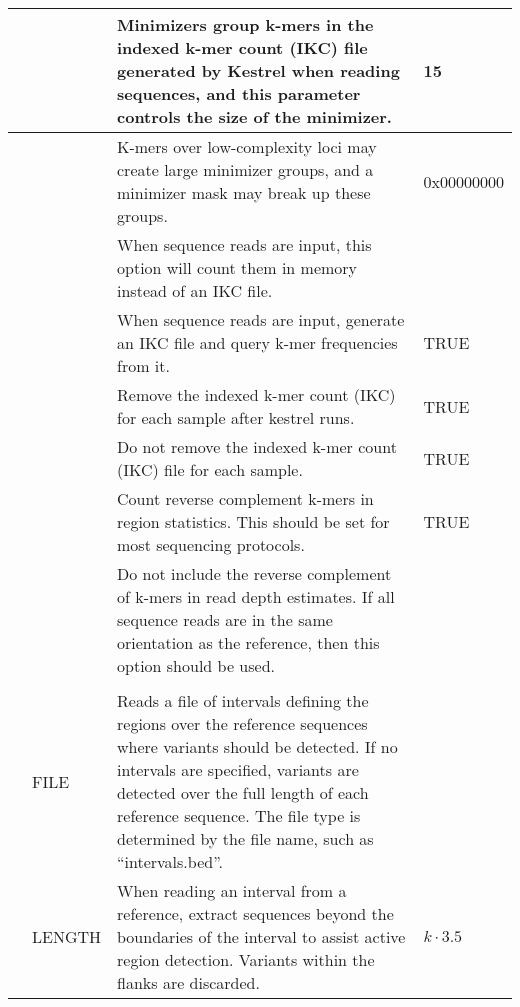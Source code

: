 \begin{small}
\begin{longtable}{|p{\optwidth}|p{\argwidth}|p{\dscwidth}|p{}|}
		\lopt{minsize} & &
		Minimizers group k-mers in the indexed k-mer count (IKC) file generated by Kestrel when reading sequences, and this parameter controls the size of the minimizer.
		& 15
		\\ \hline
		
		\lopt{minmask} & &
		K-mers over low-complexity loci may create large minimizer groups, and a minimizer mask may break up these groups.
		& 0x00000000
		\\ \hline
		
		\lopt{memcount} & &
		When sequence reads are input, this option will count them in memory instead of an IKC file.
		&
		\\ \hline
		
		\lopt{nomemcount} & &
		When sequence reads are input, generate an IKC file and query k-mer frequencies from it.
		& TRUE
		\\ \hline
		
		\lopt{rmikc} & &
		Remove the indexed k-mer count (IKC) for each sample after kestrel runs.
		& TRUE
		\\ \hline
		
		\lopt{normikc} & &
		Do not remove the indexed k-mer count (IKC) file for each sample.
		& TRUE
		\\ \hline
		
		\lopt{countrev} & &
		Count reverse complement k-mers in region statistics. This should be set for most sequencing protocols.
		& TRUE
		\\ \hline
		
		\lopt{nocountrev} & &
		Do not include the reverse complement of k-mers in read depth estimates. If all sequence reads are in the same orientation as the reference, then this option should be used.
		&
		\\ \hline
		
		\optbox{\sopt{i}\\\lopt{interval}} & FILE &
		Reads a file of intervals defining the regions over the reference sequences where variants should be detected. If no intervals are specified, variants are detected over the full length of each reference sequence. The file type is determined by the file name, such as ``intervals.bed''.
		&
		\\ \hline
		
		\lopt{flank} & LENGTH &
		When reading an interval from a reference, extract sequences beyond the boundaries of the interval to assist active region detection. Variants within the flanks are discarded.
		&
		$k \cdot 3.5$
		\\ \hline
		

\end{longtable}
\end{small}
